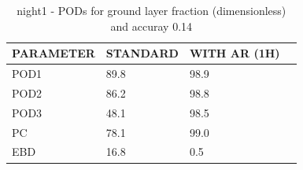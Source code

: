 \begin{table}[p!]
\begin{center}
\begin{tabular}{|l|l|l|l|}
\hline
\multicolumn{1}{|c|}{\cellcolor[HTML]{C0C0C0}\textbf{PARAMETER}} & \multicolumn{1}{c|}{\cellcolor[HTML]{C0C0C0}\textbf{STANDARD}} & \multicolumn{1}{c|}{\cellcolor[HTML]{C0C0C0}\textbf{WITH AR (1H)}} \\
\hline
\cellcolor[HTML]{C0C0C0}POD1  & 89.8                                & 98.9         \\
\cellcolor[HTML]{C0C0C0}POD2  & 86.2                                & 98.8         \\
\cellcolor[HTML]{C0C0C0}POD3  & 48.1                                & 98.5         \\
\cellcolor[HTML]{C0C0C0}PC    & 78.1                                  & 99.0           \\
\cellcolor[HTML]{C0C0C0}EBD   & 16.8                                 & 0.5          \\
\hline
\end{tabular}
\caption{night1 - PODs for ground layer fraction (dimensionless) and accuray 0.14}
\label{tab:podglf0.14:night1}
\end{center}
\end{table}
